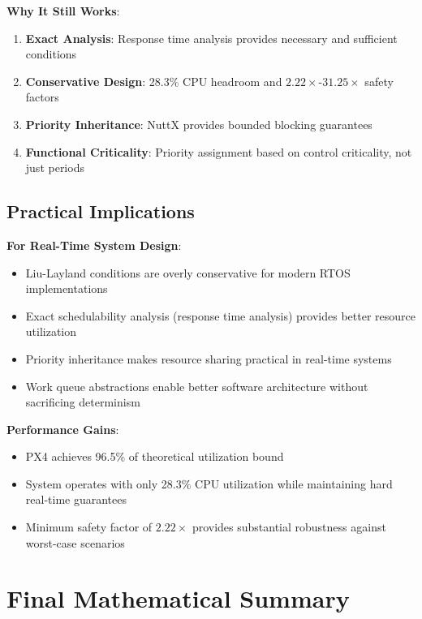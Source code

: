 \documentclass[12pt,a4paper]{article}
\begin{document}
\textbf{Why It Still Works}:
\begin{enumerate}
\item \textbf{Exact Analysis}: Response time analysis provides necessary and sufficient conditions
\item \textbf{Conservative Design}: 28.3\% CPU headroom and $2.22\times$-$31.25\times$ safety factors
\item \textbf{Priority Inheritance}: NuttX provides bounded blocking guarantees
\item \textbf{Functional Criticality}: Priority assignment based on control criticality, not just periods
\end{enumerate}

\subsection{Practical Implications}

\textbf{For Real-Time System Design}:
\begin{itemize}
\item Liu-Layland conditions are overly conservative for modern RTOS implementations
\item Exact schedulability analysis (response time analysis) provides better resource utilization
\item Priority inheritance makes resource sharing practical in real-time systems
\item Work queue abstractions enable better software architecture without sacrificing determinism
\end{itemize}

\textbf{Performance Gains}:
\begin{itemize}
\item PX4 achieves 96.5\% of theoretical utilization bound
\item System operates with only 28.3\% CPU utilization while maintaining hard real-time guarantees
\item Minimum safety factor of $2.22\times$ provides substantial robustness against worst-case scenarios
\end{itemize}

\section{Final Mathematical Summary}
\end{document}
